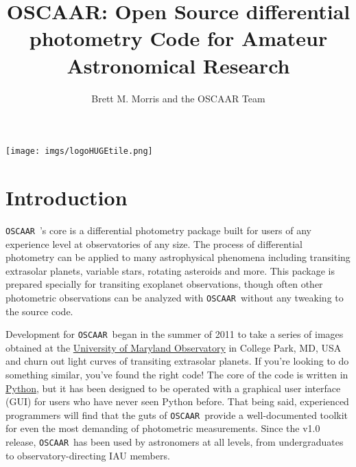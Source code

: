 \documentclass[a4paper]{article}
\newcommand{\code}[1]{\texttt{#1}}
\newcommand{\oscaar}{\code{OSCAAR}~}
\begin{document}
\title{\textbf{OSCAAR}: Open Source differential photometry Code for Amateur Astronomical Research}
\author{Brett M. Morris and the OSCAAR Team}
\maketitle
\begin{center}
\texttt{[image: imgs/logoHUGEtile.png]}
\end{center}
\pagebreak
\tableofcontents
\pagebreak




\section{Introduction}

\oscaar's core is a differential photometry package built for users of any experience level at observatories of any size. The process of differential photometry can be applied to many astrophysical phenomena including transiting extrasolar planets, variable stars, rotating asteroids and more. This package is prepared specially for transiting exoplanet observations, though often other photometric observations can be analyzed with \oscaar without any tweaking to the source code.

Development for \oscaar began in the summer of 2011 to take a series of images obtained at the \href{http://www.astro.umd.edu/openhouse/}{University of Maryland Observatory} in College Park, MD, USA and churn out light curves of transiting extrasolar planets. If you're looking to do something similar, you've found the right code! The core of the code is written in \href{http://www.python.org/}{Python}, but it has been designed to be operated with a graphical user interface (GUI) for users who have never seen Python before. That being said, experienced programmers will find that the guts of \oscaar provide a well-documented toolkit for even the most demanding of photometric measurements. Since the v1.0 release, \oscaar has been used by astronomers at all levels, from undergraduates to observatory-directing IAU members.
\end{document}
